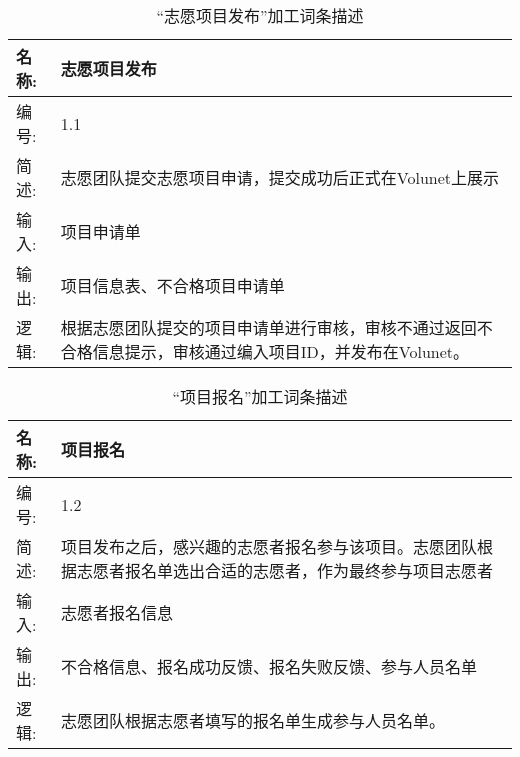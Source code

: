 \begin{table}[H]  
\caption{“志愿项目发布”加工词条描述}  
\begin{center}  
    \begin{tabular}{l p{11cm}} 
        \hline
        \quad 名称: & 志愿项目发布\\
        \hline
        \quad 编号: & 1.1 \\
        \hline
        \quad 简述: & 志愿团队提交志愿项目申请，提交成功后正式在Volunet上展示 \\
        \hline
        \quad 输入:& 项目申请单 \\
        \hline
        \quad 输出:& 项目信息表、不合格项目申请单\\
        \hline
        \quad 逻辑:& 根据志愿团队提交的项目申请单进行审核，审核不通过返回不合格信息提示，审核通过编入项目ID，并发布在Volunet。 \\
        \hline
    \end{tabular}
    \label{tab1}
\end{center}
\end{table}

\begin{table}[H]  
\caption{“项目报名”加工词条描述}  
\begin{center}  
    \begin{tabular}{l p{11cm}} 
        \hline
        \quad 名称: & 项目报名 \\
        \hline
        \quad 编号: & 1.2 \\
        \hline
        \quad 简述: & 项目发布之后，感兴趣的志愿者报名参与该项目。志愿团队根据志愿者报名单选出合适的志愿者，作为最终参与项目志愿者 \\
        \hline
        \quad 输入: & 志愿者报名信息 \\
        \hline
        \quad 输出: & 不合格信息、报名成功反馈、报名失败反馈、参与人员名单\\
        \hline
        \quad 逻辑: & 志愿团队根据志愿者填写的报名单生成参与人员名单。 \\
        \hline
    \end{tabular}
    \label{tab1}
\end{center}
\end{table}

